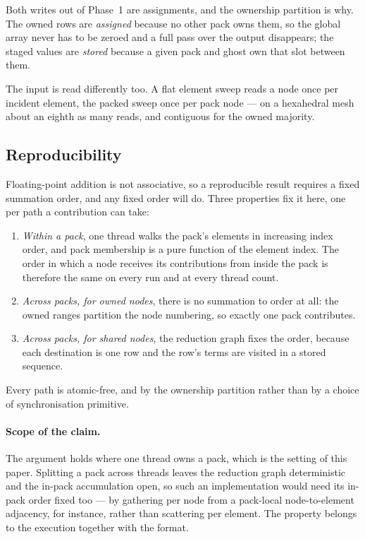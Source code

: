 \documentclass[sigconf,nonacm]{acmart}
\begin{document}
Both writes out of Phase~1 are assignments, and the ownership partition is why. The owned rows
are \emph{assigned} because no other pack owns them, so the global array never has to be zeroed
and a full pass over the output disappears; the staged values are \emph{stored} because a given
pack and ghost own that slot between them.

The input is read differently too. A flat element sweep reads a node once per incident element,
the packed sweep once per pack node --- on a hexahedral mesh about an eighth as many reads, and
contiguous for the owned majority.

\subsection{Reproducibility}
\label{sec:apply:determinism}

Floating-point addition is not associative, so a reproducible result requires a fixed summation
order, and any fixed order will do. Three properties fix it here, one per path a contribution
can take:

\begin{enumerate}
  \item \emph{Within a pack}, one thread walks the pack's elements in increasing index order,
        and pack membership is a pure function of the element index. The order in which a node
        receives its contributions from inside the pack is therefore the same on every run and
        at every thread count.
  \item \emph{Across packs, for owned nodes}, there is no summation to order at all: the owned
        ranges partition the node numbering, so exactly one pack contributes.
  \item \emph{Across packs, for shared nodes}, the reduction graph fixes the order, because
        each destination is one row and the row's terms are visited in a stored sequence.
\end{enumerate}

\noindent
Every path is atomic-free, and by the ownership partition rather than by a choice of
synchronisation primitive.

\paragraph{Scope of the claim.} The argument holds where one thread owns a pack, which is the
setting of this paper. Splitting a pack across threads leaves the reduction graph deterministic
and the in-pack accumulation open, so such an implementation would need its in-pack order fixed
too --- by gathering per node from a pack-local node-to-element adjacency, for instance, rather
than scattering per element. The property belongs to the execution together with the format.
\end{document}
